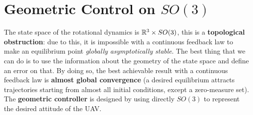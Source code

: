 \documentclass[10pt, a4paper]{report}
\begin{document}
\section{Geometric Control on $SO(3)$}
The state space of the rotational dynamics is ${\mathbb R}^3\times SO(3)$, this is a \textbf{topological obstruction}: due to this, it is impossible with a continuous feedback law to make an equilibrium point \textit{globally asymptotically stable}. The best thing that we can do is to use the information about the geometry of the state space and define an error on that. By doing so, the best achievable result with a continuous feedback law is \textbf{almost global convergence} (a desired equilibrium attracts trajectories starting from almost all initial conditions, except a zero-measure set). The \textbf{geometric controller} is designed by using directly $SO(3)$ to represent the desired attitude of the UAV.\bigskip
\end{document}
